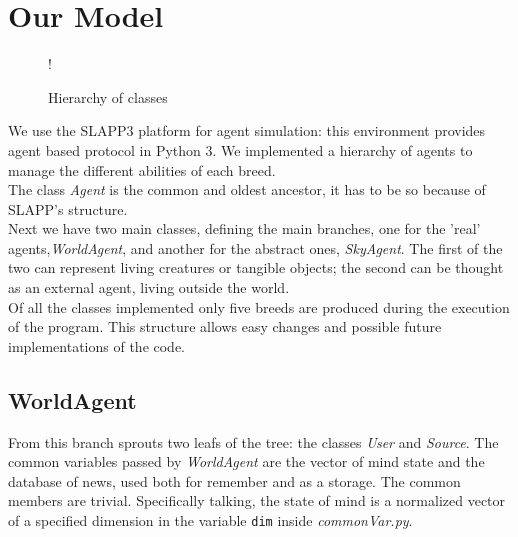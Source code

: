 \section{Our Model}
\begin{figure}
  \begin{center}
     {!} {
    }
  \end{center}
  \caption{Hierarchy of classes}
  \label{fig:hierarchy}
\end{figure}
We use the SLAPP3 platform for agent simulation: this environment provides agent
based protocol in Python 3.
We implemented a hierarchy of agents to manage the different abilities of
each breed.
\\
The class \textit{Agent} is the common and oldest ancestor,
it has to be so because of SLAPP's structure.\\
Next we have two main classes, defining the main branches,
one for the 'real' agents,\textit{WorldAgent}, and another for
the abstract ones, \textit{SkyAgent}.
The first of the two can represent living creatures or tangible objects;
the second can be thought as an external agent, living outside the world.\\
Of all the classes implemented only five breeds are produced during
the execution of the program.
This structure allows easy changes and possible future implementations
of the code.

\subsection{WorldAgent}
From this branch sprouts two leafs of the tree: the classes \textit{User}
and \textit{Source}.
The common variables passed by \textit{WorldAgent} are
the vector of mind state and the database of news, used both for remember
and as a storage. The common members are trivial.
Specifically talking, the state of mind is a normalized vector of a
specified dimension in the variable \texttt{dim} inside
\textit{commonVar.py}.

